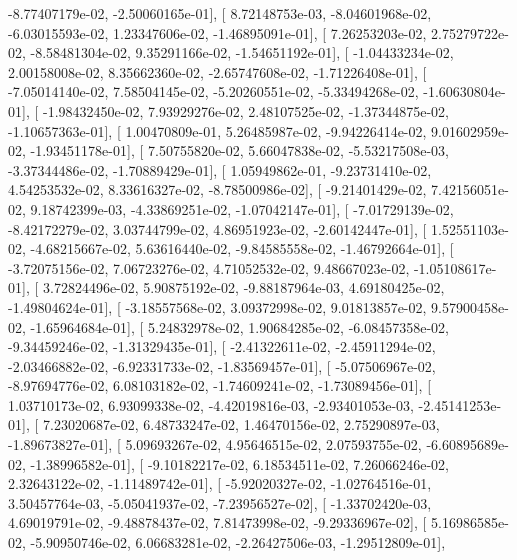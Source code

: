 \documentclass{article}
\begin{document}
         -8.77407179e-02,  -2.50060165e-01],
       [  8.72148753e-03,  -8.04601968e-02,  -6.03015593e-02,
          1.23347606e-02,  -1.46895091e-01],
       [  7.26253203e-02,   2.75279722e-02,  -8.58481304e-02,
          9.35291166e-02,  -1.54651192e-01],
       [ -1.04433234e-02,   2.00158008e-02,   8.35662360e-02,
         -2.65747608e-02,  -1.71226408e-01],
       [ -7.05014140e-02,   7.58504145e-02,  -5.20260551e-02,
         -5.33494268e-02,  -1.60630804e-01],
       [ -1.98432450e-02,   7.93929276e-02,   2.48107525e-02,
         -1.37344875e-02,  -1.10657363e-01],
       [  1.00470809e-01,   5.26485987e-02,  -9.94226414e-02,
          9.01602959e-02,  -1.93451178e-01],
       [  7.50755820e-02,   5.66047838e-02,  -5.53217508e-03,
         -3.37344486e-02,  -1.70889429e-01],
       [  1.05949862e-01,  -9.23731410e-02,   4.54253532e-02,
          8.33616327e-02,  -8.78500986e-02],
       [ -9.21401429e-02,   7.42156051e-02,   9.18742399e-03,
         -4.33869251e-02,  -1.07042147e-01],
       [ -7.01729139e-02,  -8.42172279e-02,   3.03744799e-02,
          4.86951923e-02,  -2.60142447e-01],
       [  1.52551103e-02,  -4.68215667e-02,   5.63616440e-02,
         -9.84585558e-02,  -1.46792664e-01],
       [ -3.72075156e-02,   7.06723276e-02,   4.71052532e-02,
          9.48667023e-02,  -1.05108617e-01],
       [  3.72824496e-02,   5.90875192e-02,  -9.88187964e-03,
          4.69180425e-02,  -1.49804624e-01],
       [ -3.18557568e-02,   3.09372998e-02,   9.01813857e-02,
          9.57900458e-02,  -1.65964684e-01],
       [  5.24832978e-02,   1.90684285e-02,  -6.08457358e-02,
         -9.34459246e-02,  -1.31329435e-01],
       [ -2.41322611e-02,  -2.45911294e-02,  -2.03466882e-02,
         -6.92331733e-02,  -1.83569457e-01],
       [ -5.07506967e-02,  -8.97694776e-02,   6.08103182e-02,
         -1.74609241e-02,  -1.73089456e-01],
       [  1.03710173e-02,   6.93099338e-02,  -4.42019816e-03,
         -2.93401053e-03,  -2.45141253e-01],
       [  7.23020687e-02,   6.48733247e-02,   1.46470156e-02,
          2.75290897e-03,  -1.89673827e-01],
       [  5.09693267e-02,   4.95646515e-02,   2.07593755e-02,
         -6.60895689e-02,  -1.38996582e-01],
       [ -9.10182217e-02,   6.18534511e-02,   7.26066246e-02,
          2.32643122e-02,  -1.11489742e-01],
       [ -5.92020327e-02,  -1.02764516e-01,   3.50457764e-03,
         -5.05041937e-02,  -7.23956527e-02],
       [ -1.33702420e-03,   4.69019791e-02,  -9.48878437e-02,
          7.81473998e-02,  -9.29336967e-02],
       [  5.16986585e-02,  -5.90950746e-02,   6.06683281e-02,
         -2.26427506e-03,  -1.29512809e-01],
\end{document}
